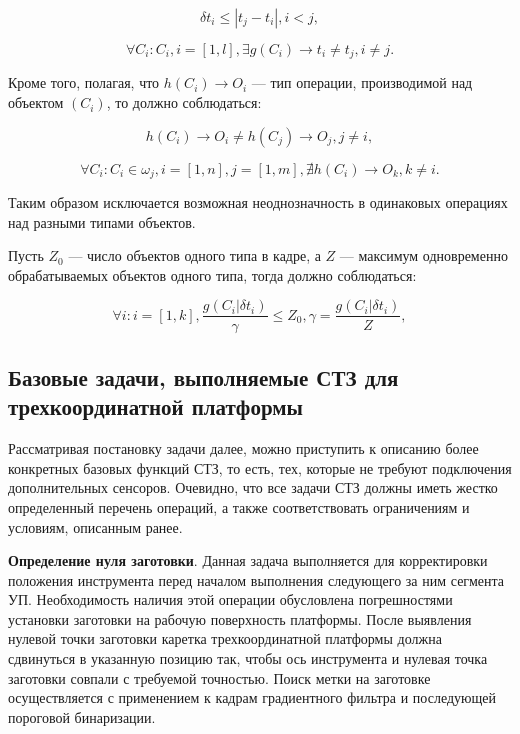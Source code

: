 \begin{equation}
\delta t_i \leq |t_j - t_i|, i < j,
\label{eq_3_16}
\end{equation}

\begin{equation}
\forall C_i: C_i, i = [1, l], \exists g(C_i) \to t_i \neq t_j, i \neq j.
\label{eq_3_17}
\end{equation}

Кроме того, полагая, что $h(C_i) \to O_i$ --- тип операции, производимой над объектом $(C_i)$, то должно соблюдаться:

\begin{equation}
h(C_i) \to O_i \neq h(C_j) \to O_j, j \neq i,
\label{eq_3_18}
\end{equation}

\begin{equation}
\forall C_i: C_i \in \omega_j, i = [1, n], j = [1, m], \nexists h(C_i) \to O_k, k \neq i.
\label{eq_3_19}
\end{equation}

Таким образом исключается возможная неоднозначность в одинаковых операциях над разными типами объектов.

Пусть $Z_0$ --- число объектов одного типа в кадре, а $Z$ --- максимум одновременно обрабатываемых объектов одного типа, тогда должно соблюдаться:

\begin{equation}
\forall i: i=[1, k], \frac{g(C_i | \delta t_i)}{\gamma} \leq Z_0, \gamma = \frac{g(C_i | \delta t_i)}{Z},
\label{eq_3_20}
\end{equation}

\subsection{Базовые задачи, выполняемые СТЗ для трехкоординатной платформы} \label{ssect3_3_2}

Рассматривая постановку задачи далее, можно приступить к описанию более конкретных базовых функций СТЗ, то есть, тех, которые не требуют подключения дополнительных сенсоров. Очевидно, что все задачи СТЗ должны иметь жестко определенный перечень операций, а также соответствовать ограничениям и условиям, описанным ранее.

\textbf{Определение нуля заготовки}. Данная задача выполняется для корректировки положения инструмента перед началом выполнения следующего за ним сегмента УП. Необходимость наличия этой операции обусловлена погрешностями установки заготовки на рабочую поверхность платформы. После выявления нулевой точки заготовки каретка трехкоординатной платформы должна сдвинуться в указанную позицию так, чтобы ось инструмента и нулевая точка заготовки совпали с требуемой точностью. Поиск метки на заготовке осуществляется с применением к кадрам градиентного фильтра и последующей пороговой бинаризации.

